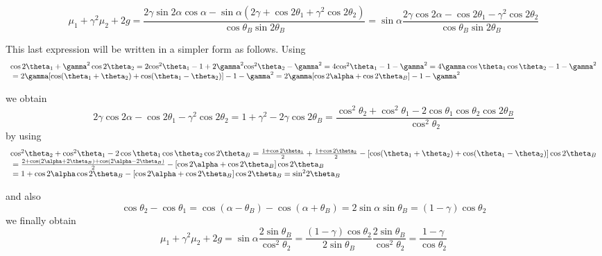 \documentclass{iucr}              %
\begin{document}
\begin{equation}
{\mu _1} + {\gamma ^2}{\mu _2} + 2g = \frac{{2\gamma \sin 2\alpha \cos \alpha  - \sin \alpha (2\gamma  + \cos 2{\theta _1} + {\gamma ^2}\cos 2{\theta _2})}}{{\cos {\theta _B}\sin 2{\theta _B}}} = \sin \alpha \frac{{2\gamma \cos 2\alpha  - \cos 2{\theta _1} - {\gamma ^2}\cos 2{\theta _2}}}{{\cos {\theta _B}\sin 2{\theta _B}}}
\end{equation}

This last expression will be written in a simpler form as follows. Using 
\begin{equation}
\begin{array}{l}
\cos 2{\theta _1} + {\gamma ^2}\cos 2{\theta _2} = 2{\cos ^2}{\theta _1} - 1 + 2{\gamma ^2}{\cos ^2}{\theta _2} - {\gamma ^2} = 4{\cos ^2}{\theta _1} - 1 - {\gamma ^2} = 4\gamma \cos {\theta _1}\cos {\theta _2} - 1 - {\gamma ^2}\\
{\rm{   }} = 2\gamma [\cos ({\theta _1} + {\theta _2}) + \cos ({\theta _1} - {\theta _2})] - 1 - {\gamma ^2} = 2\gamma [\cos 2\alpha  + \cos 2{\theta _B}] - 1 - {\gamma ^2}
\end{array}
\end{equation}

we obtain 
\begin{equation}
2\gamma \cos 2\alpha  - \cos 2{\theta _1} - {\gamma ^2}\cos 2{\theta _2} = 1 + {\gamma ^2} - 2\gamma \cos 2{\theta _B} = \frac{{{{\cos }^2}{\theta _2} + {{\cos }^2}{\theta _1} - 2\cos {\theta _1}\cos {\theta _2}\cos 2{\theta _B}}}{{{{\cos }^2}{\theta _2}}}
\end{equation}
 by using
 \begin{equation}
 \begin{array}{l}
{\cos ^2}{\theta _2} + {\cos ^2}{\theta _1} - 2\cos {\theta _1}\cos {\theta _2}\cos 2{\theta _B} = \frac{{1 + \cos 2{\theta _1}}}{2} + \frac{{1 + \cos 2{\theta _2}}}{2} - [\cos ({\theta _1} + {\theta _2}) + \cos ({\theta _1} - {\theta _2})]\cos 2{\theta _B}\\
{\rm{   }} = \frac{{2 + \cos (2\alpha  + 2{\theta _B}) + \cos (2\alpha  - 2{\theta _B})}}{2} - [\cos 2\alpha  + \cos 2{\theta _B}]\cos 2{\theta _B}\\
{\rm{      }} = 1 + \cos 2\alpha \cos 2{\theta _B} - [\cos 2\alpha  + \cos 2{\theta _B}]\cos 2{\theta _B} = {\sin ^2}2{\theta _B}
\end{array}
\end{equation}

and also 
\begin{equation}
\cos {\theta _2} - \cos {\theta _1} = \cos (\alpha  - {\theta _B}) - \cos (\alpha  + {\theta _B}) = 2\sin \alpha \sin {\theta _B} = (1 - \gamma )\cos {\theta _2}
\end{equation}
we finally obtain 
\begin{equation}
{\mu _1} + {\gamma ^2}{\mu _2} + 2g = \sin \alpha \frac{{2\sin {\theta _B}}}{{{{\cos }^2}{\theta _2}}} = \frac{{(1 - \gamma )\cos {\theta _2}}}{{2\sin {\theta _B}}}\frac{{2\sin {\theta _B}}}{{{{\cos }^2}{\theta _2}}} = \frac{{1 - \gamma }}{{\cos {\theta _2}}}
\end{equation}
\end{document}
